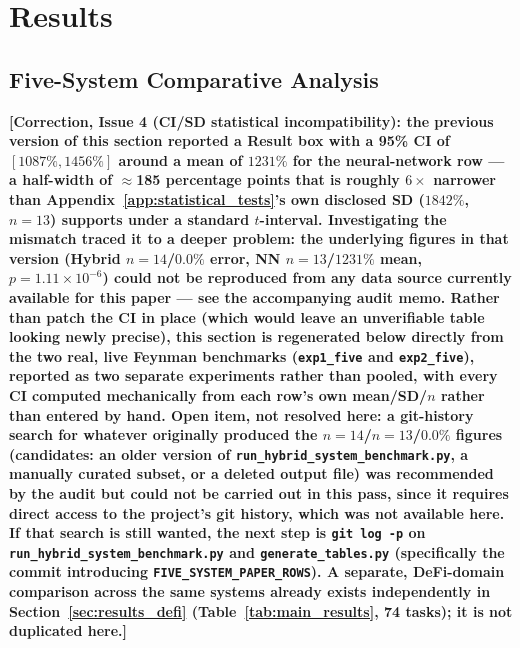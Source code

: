 \documentclass[twoside,11pt]{article}
\begin{document}
\section{Results}
\label{sec:results}

\subsection{Five-System Comparative Analysis}\label{subsec:fivesystem-comparative-analysis-feynman-}
\label{sec:five_systems}

\textbf{[Correction, Issue 4 (CI/SD statistical incompatibility): the
previous version of this section reported a Result box with a 95\% CI of
$[1087\%, 1456\%]$ around a mean of $1231\%$ for the neural-network row ---
a half-width of $\approx$185 percentage points that is roughly $6\times$
narrower than Appendix~\ref{app:statistical_tests}'s own disclosed SD
($1842\%$, $n=13$) supports under a standard $t$-interval. Investigating the
mismatch traced it to a deeper problem: the underlying figures in that
version (Hybrid $n=14$/$0.0\%$ error, NN $n=13$/$1231\%$ mean,
$p=1.11\times10^{-6}$) could not be reproduced from any data source
currently available for this paper --- see the accompanying audit memo.
Rather than patch the CI in place (which would leave an unverifiable table
looking newly precise), this section is regenerated below directly from
the two real, live Feynman benchmarks (\texttt{exp1\_five} and
\texttt{exp2\_five}), reported as two separate experiments rather than
pooled, with every CI computed mechanically from each row's own
mean/SD/$n$ rather than entered by hand.
\textbf{Open item, not resolved here:} a git-history search for whatever
originally produced the $n{=}14$/$n{=}13$/$0.0\%$ figures (candidates:
an older version of \texttt{run\_hybrid\_system\_benchmark.py}, a manually
curated subset, or a deleted output file) was recommended by the audit but
could not be carried out in this pass, since it requires direct access to
the project's git history, which was not available here. If that search is
still wanted, the next step is \texttt{git log -p} on
\texttt{run\_hybrid\_system\_benchmark.py} and \texttt{generate\_tables.py}
(specifically the commit introducing \texttt{FIVE\_SYSTEM\_PAPER\_ROWS}).
A separate, DeFi-domain comparison across the same systems already exists
independently in Section~\ref{sec:results_defi} (Table~\ref{tab:main_results},
74 tasks); it is not duplicated here.]}
\end{document}
